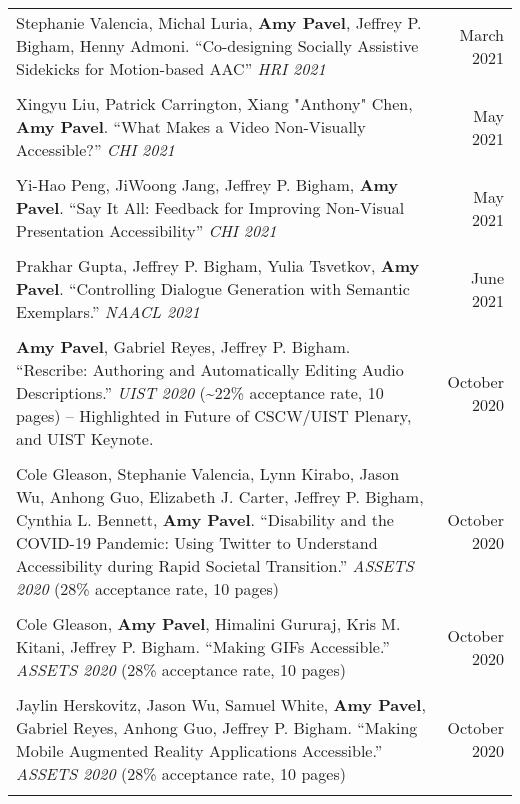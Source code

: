 \begin{longtable}{Xr}
	Stephanie Valencia, Michal Luria, \textbf{Amy Pavel}, Jeffrey P. Bigham, Henny Admoni. ``Co-designing Socially Assistive Sidekicks for Motion-based AAC'' \textit{HRI 2021} & March 2021 \\
	\\

	Xingyu Liu, Patrick Carrington, Xiang "Anthony" Chen, \textbf{Amy Pavel}. ``What Makes a Video Non-Visually Accessible?'' \textit{CHI 2021} & May 2021 \\
	\\

	Yi-Hao Peng, JiWoong Jang, Jeffrey P. Bigham, \textbf{Amy Pavel}. ``Say It All: Feedback for Improving Non-Visual Presentation Accessibility'' \textit{CHI 2021} & May 2021 \\
	\\

	Prakhar Gupta, Jeffrey P. Bigham, Yulia Tsvetkov, \textbf{Amy Pavel}. ``Controlling Dialogue Generation with Semantic Exemplars.'' \textit{NAACL 2021} & June 2021 \\
	\\

	\textbf{Amy Pavel}, Gabriel Reyes, Jeffrey P. Bigham. ``Rescribe: Authoring and Automatically Editing Audio Descriptions.'' \textit{UIST 2020} (\textasciitilde22\% acceptance rate, 10 pages) -- Highlighted in Future of CSCW/UIST Plenary, and UIST Keynote. & October 2020 \\
	\\

	Cole Gleason, Stephanie Valencia, Lynn Kirabo, Jason Wu, Anhong Guo, Elizabeth J. Carter, Jeffrey P. Bigham, Cynthia L. Bennett, \textbf{Amy Pavel}. ``Disability and the COVID-19 Pandemic: Using Twitter to Understand Accessibility during Rapid Societal Transition.'' \textit{ASSETS 2020} (28\% acceptance rate, 10 pages) & October 2020 \\
	\\

	Cole Gleason, \textbf{Amy Pavel}, Himalini Gururaj, Kris M. Kitani, Jeffrey P. Bigham. ``Making GIFs Accessible.'' \textit{ASSETS 2020} (28\% acceptance rate, 10 pages) & October 2020 \\
	\\

	Jaylin Herskovitz, Jason Wu, Samuel White, \textbf{Amy Pavel}, Gabriel Reyes, Anhong Guo, Jeffrey P. Bigham. ``Making Mobile Augmented Reality Applications Accessible.'' \textit{ASSETS 2020} (28\% acceptance rate, 10 pages) & October 2020 \\
	\\


\end{longtable}
